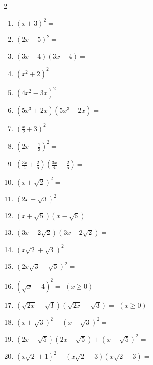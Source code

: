 \documentclass[11pt,a4paper]{article}
\begin{document}
\begin{multicols}{2}
\begin{enumerate}[label=\textbf{\alph*)}]
    \item $\left(x + 3\right)^2 =$
    \item $\left(2x - 5\right)^2 =$
    \item $\left(3x + 4\right)\left(3x - 4\right) =$
    \item $\left(x^2 + 2\right)^2 =$
    \item $\left(4x^2 - 3x\right)^2 =$
    \item $\left(5x^3 + 2x\right)\left(5x^3 - 2x\right) =$
    
    \item $\left(\frac{x}{2} + 3\right)^2 =$
    \item $\left(2x - \frac{1}{3}\right)^2 =$
    \item $\left(\frac{3x}{4} + \frac{2}{5}\right)\left(\frac{3x}{4} - \frac{2}{5}\right) =$
    
    \item $\left(x + \sqrt{2}\right)^2 =$
    \item $\left(2x - \sqrt{3}\right)^2 =$
    \item $\left(x + \sqrt{5}\right)\left(x - \sqrt{5}\right) =$
    \item $\left(3x + 2\sqrt{2}\right)\left(3x - 2\sqrt{2}\right) =$
    \item $\left(x\sqrt{2} + \sqrt{3}\right)^2 =$
    \item $\left(2x\sqrt{3} - \sqrt{5}\right)^2 =$
    \item $\left(\sqrt{x} + 4\right)^2 =$ \quad $(x \ge 0)$
    \item $\left(\sqrt{2x} - \sqrt{3}\right)\left(\sqrt{2x} + \sqrt{3}\right) =$ \quad $(x \ge 0)$
    
    \item $\left(x + \sqrt{3}\right)^2 - \left(x - \sqrt{3}\right)^2 =$
    \item $\left(2x + \sqrt{5}\right)\left(2x - \sqrt{5}\right) + \left(x - \sqrt{5}\right)^2 =$
    \item $\left(x\sqrt{2} + 1\right)^2 - \left(x\sqrt{2} + 3\right)\left(x\sqrt{2} - 3\right) =$
\end{enumerate}
\end{multicols}
\end{document}
